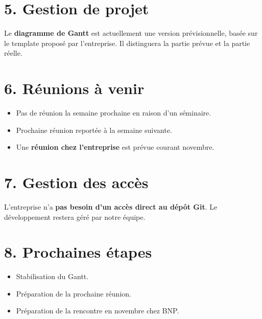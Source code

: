 \documentclass[a4paper,11pt]{article}
\begin{document}
\section*{5. Gestion de projet}
Le \textbf{diagramme de Gantt} est actuellement une version prévisionnelle, basée sur le template proposé par l’entreprise. Il distinguera la partie prévue et la partie réelle.

\section*{6. Réunions à venir}
\begin{itemize}
    \item Pas de réunion la semaine prochaine en raison d’un séminaire.
    \item Prochaine réunion reportée à la semaine suivante.
    \item Une \textbf{réunion chez l’entreprise} est prévue courant novembre.
\end{itemize}

\section*{7. Gestion des accès}
L’entreprise n’a \textbf{pas besoin d’un accès direct au dépôt Git}. Le développement restera géré par notre équipe.

\section*{8. Prochaines étapes}
\begin{itemize}
    \item Stabilisation du Gantt.
    \item Préparation de la prochaine réunion.
    \item Préparation de la rencontre en novembre chez BNP.
\end{itemize}
\end{document}

